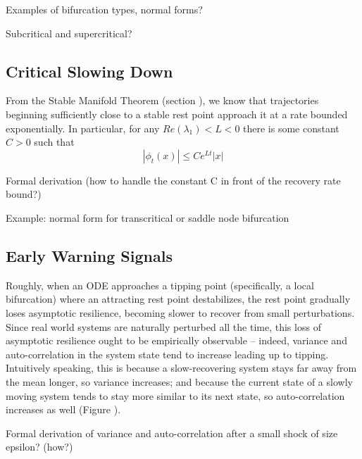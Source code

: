 Examples of bifurcation types, normal forms?

Subcritical and supercritical?

\subsection{Critical Slowing Down}

From the Stable Manifold Theorem (section ), we know that trajectories beginning sufficiently close to a stable rest point approach it at a rate bounded exponentially. In particular, for any $Re(\lambda_1) < L < 0$ there is some constant $C >0$ such that
$$|\phi_t(x)| \leq Ce^{Lt}|x|$$


Formal derivation (how to handle the constant C in front of the recovery rate bound?)

Example: normal form for transcritical or saddle node bifurcation

\subsection{Early Warning Signals}

Roughly, when an ODE approaches a tipping point (specifically, a local bifurcation) where an attracting rest point destabilizes, the rest point gradually loses asymptotic resilience, becoming slower to recover from small perturbations. Since real world systems are naturally perturbed all the time, this loss of asymptotic resilience ought to be empirically observable -- indeed, variance and auto-correlation in the system state tend to increase leading up to tipping. Intuitively speaking, this is because a slow-recovering system stays far away from the mean longer, so variance increases; and because the current state of a slowly moving system tends to stay more similar to its next state, so auto-correlation increases as well (Figure ).


Formal derivation of variance and auto-correlation after a small shock of size epsilon? (how?)

	
